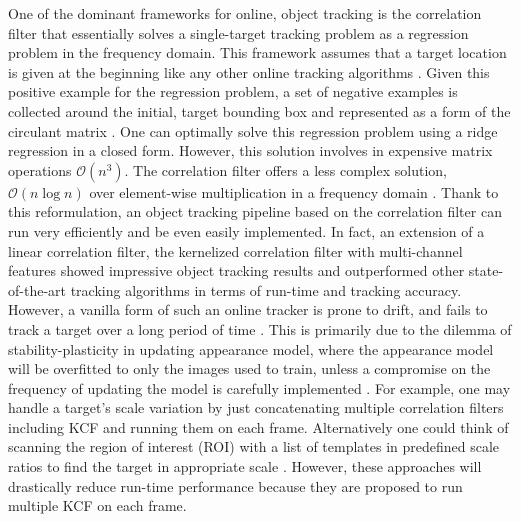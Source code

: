 \documentclass[10pt,twocolumn,letterpaper]{article}
\begin{document}
One of the dominant frameworks for online, object tracking is the
correlation filter that essentially solves a single-target tracking
problem as a regression problem in the frequency domain. This
framework assumes that a target location is given at the beginning
like any other online tracking algorithms
\cite{smeulders2014survey}. Given this positive example for the
regression problem, a set of negative examples is collected around the
initial, target bounding box and represented as a form of the
circulant matrix \cite{henriques2015high}. One can optimally solve
this regression problem using a ridge regression in a closed
form. However, this solution involves in expensive matrix operations
$\mathcal{O}(n^{3})$. The correlation filter offers a less complex
solution, $\mathcal{O}(n\log n)$ over element-wise multiplication in a
frequency domain \cite{bolme2010visual,henriques2015high}. Thank to
this reformulation, an object tracking pipeline based on the
correlation filter can run very efficiently and be even easily
implemented. In fact, an extension of a linear correlation filter, the
kernelized correlation filter with multi-channel features
\cite{henriques2015high} showed impressive object tracking results and
outperformed other state-of-the-art tracking algorithms in terms of
run-time and tracking accuracy. However, a vanilla form of such an
online tracker is prone to drift, and fails to track a target over a
long period of time \cite{henriques2015high}. This is primarily due to
the dilemma of stability-plasticity in updating appearance model,
where the appearance model will be overfitted to only the images used
to train, unless a compromise on the frequency of updating the model
is carefully implemented \cite{santner2010prost}. For example, one may
handle a target's scale variation by just concatenating multiple
correlation filters including KCF and running them on each
frame. Alternatively one could think of scanning the region of
interest (ROI) with a list of templates in predefined scale ratios to
find the target in appropriate scale
\cite{henriques2015high,tang2015multi,ma2015long,bibi2015multi,li2014scale}. However,
these approaches will drastically reduce run-time performance because
they are proposed to run multiple KCF on each frame.
\end{document}
